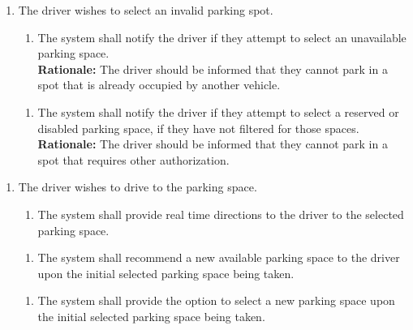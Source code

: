 \documentclass[12pt,letterpaper]{article}
\newcounter{businesseventnum}
\newcounter{funcreqnum}
\begin{document}
\begin{enumerate}[{BE}\thebusinesseventnum.] 
\item The driver wishes to select an invalid parking spot.
\begin{enumerate}[{FR}\thefuncreqnum.] 
    \item The system shall notify the driver if they attempt to select an
    unavailable parking space.\\
    \textbf{Rationale:} The driver should be informed that they cannot park in a
    spot that is already occupied by another vehicle.
\end{enumerate}
\begin{enumerate}[{FR}\thefuncreqnum.] 
    \item The system shall notify the driver if they attempt to select a
    reserved or disabled parking space, if they have not filtered for those
    spaces.\\
    \textbf{Rationale:} The driver should be informed that they cannot park in a
    spot that requires other authorization.
\end{enumerate}
\end{enumerate}

\begin{enumerate}[{BE}\thebusinesseventnum.] 
\item The driver wishes to drive to the parking space.
\begin{enumerate}[{FR}\thefuncreqnum.] 
    \item The system shall provide real time directions to the driver to the
    selected parking space.
\end{enumerate}
\begin{enumerate}[{FR}\thefuncreqnum.] 
    \item The system shall recommend a new available parking space to the driver
    upon the initial selected parking space being taken.
\end{enumerate}
\begin{enumerate}[{FR}\thefuncreqnum.] 
    \item The system shall provide the option to select a new parking space upon
    the initial selected parking space being taken.
\end{enumerate}
\end{enumerate}
\end{document}
